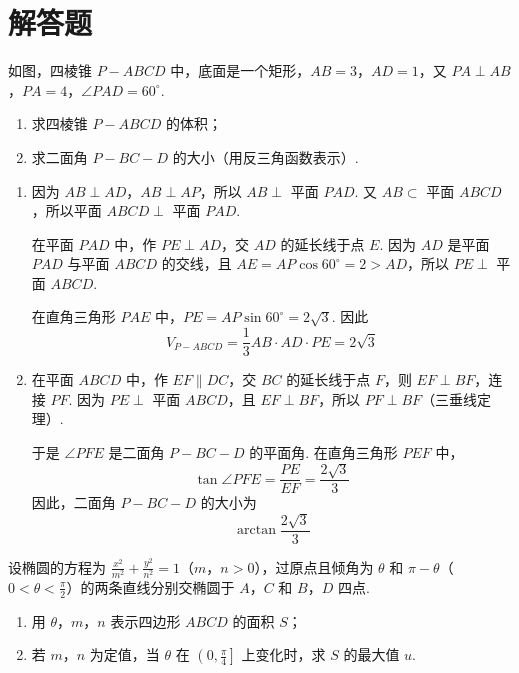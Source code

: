 \documentclass[UTF8,a4paper,oneside,11pt]{ctexbook}
\begin{document}
\section{解答题}

\begin{problem}
如图，四棱锥 \(P-ABCD\) 中，底面是一个矩形，\(AB=3\)，\(AD=1\)，又 \(PA\perp AB\)，\(PA=4\)，\(\angle PAD=60^\circ\).

\begin{enumerate}
\item 求四棱锥 \(P-ABCD\) 的体积；
\item 求二面角 \(P-BC-D\) 的大小（用反三角函数表示）.
\end{enumerate}

\end{problem}

\begin{solution}
\begin{enumerate}
\item 因为 \(AB\perp AD\)，\(AB\perp AP\)，所以 \(AB\perp\) 平面 \(PAD\). 又 \(AB\subset\) 平面 \(ABCD\)，所以平面 \(ABCD\perp\) 平面 \(PAD\).

在平面 \(PAD\) 中，作 \(PE\perp AD\)，交 \(AD\) 的延长线于点 \(E\). 因为 \(AD\) 是平面 \(PAD\) 与平面 \(ABCD\) 的交线，且 \(AE=AP\cos60^\circ=2>AD\)，所以 \(PE\perp\) 平面 \(ABCD\).

在直角三角形 \(PAE\) 中，\(PE=AP\sin60^\circ=2\sqrt{3}\). 因此
\[
V_{P-ABCD}=\frac{1}{3}AB\cdot AD\cdot PE=2\sqrt{3}
\]

\item 在平面 \(ABCD\) 中，作 \(EF\parallel DC\)，交 \(BC\) 的延长线于点 \(F\)，则 \(EF\perp BF\)，连接 \(PF\). 因为 \(PE\perp\) 平面 \(ABCD\)，且 \(EF\perp BF\)，所以 \(PF\perp BF\)（三垂线定理）.

于是 \(\angle PFE\) 是二面角 \(P-BC-D\) 的平面角. 在直角三角形 \(PEF\) 中，
\[
\tan\angle PFE=\frac{PE}{EF}=\frac{2\sqrt{3}}{3}
\]
因此，二面角 \(P-BC-D\) 的大小为
\[
\arctan\frac{2\sqrt{3}}{3}
\]
\end{enumerate}
\end{solution}

\begin{problem}
设椭圆的方程为 \(\frac{x^2}{m^2}+\frac{y^2}{n^2}=1\)（\(m\)，\(n>0\)），过原点且倾角为 \(\theta\) 和 \(\pi-\theta\)（\(0<\theta<\frac{\pi}{2}\)）的两条直线分别交椭圆于 \(A\)，\(C\) 和 \(B\)，\(D\) 四点.

\begin{enumerate}
\item 用 \(\theta\)，\(m\)，\(n\) 表示四边形 \(ABCD\) 的面积 \(S\)；
\item 若 \(m\)，\(n\) 为定值，当 \(\theta\) 在 \(\left(0,\frac{\pi}{4}\right]\) 上变化时，求 \(S\) 的最大值 \(u\).
\end{enumerate}
\end{problem}
\end{document}
